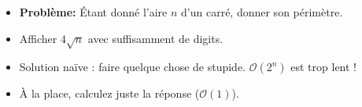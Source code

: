 \begin{frame}
    \frametitle{\problemtitle}
    \begin{itemize}
        \item<+-> \textbf{Problème:} Étant donné l'aire $n$ d'un carré, donner son périmètre.
        \item<+-> Afficher $4\sqrt{n}$ avec suffisamment de digits.
        \item<+-> Solution na\"ive : faire quelque chose de stupide. $\mathcal O(2^n)$ est trop lent !
        \item<+-> À la place, calculez juste la réponse ($\mathcal O(1)$).
    \end{itemize}
\end{frame}
